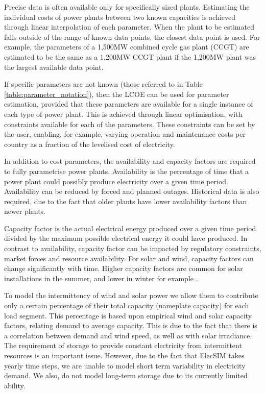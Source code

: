 Precise data is often available only for specifically sized plants. Estimating the individual costs of power plants between two known capacities is achieved through linear interpolation of each parameter. When the plant to be estimated falls outside of the range of known data points, the closest data point is used. {\color{red}For example, the parameters of a 1,500MW combined cycle gas plant (CCGT) are estimated to be the same as a 1,200MW CCGT plant if the 1,200MW plant was the largest available data point. }

If specific parameters are not known (those referred to in Table \ref{table:parameter_notation}), then the LCOE can be used for parameter estimation, provided that these parameters are available for a single instance of each type of power plant. This is achieved through linear optimisation, with constraints available for each of the parameters. These constraints can be set by the user, enabling, for example, varying operation and maintenance costs per country as a fraction of the levelised cost of electricity.


In addition to cost parameters, the availability and capacity factors are required to fully parametrise power plants. Availability is the percentage of time that a power plant could possibly produce electricity over a given time period. Availability can be reduced by forced and planned outages. Historical data is also required, due to the fact that older plants have lower availability factors than newer plants.

Capacity factor is the actual electrical energy produced over a given time period divided by the maximum possible electrical energy it could have produced. In contrast to availability, capacity factor can be impacted by regulatory constraints, market forces and resource availability. For solar and wind, capacity factors can change significantly with time. Higher capacity factors are common for solar installations in the summer, and lower in winter for example \cite{Stoft2002}. 

To model the intermittency of wind and solar power we allow them to contribute only a certain percentage of their total capacity (nameplate capacity) for each load segment. This percentage is based upon empirical wind and solar capacity factors, relating demand to average capacity. This is due to the fact that there is a correlation between demand and wind speed, as well as with solar irradiance. The requirement of storage to provide constant electricity from intermittent resources is an important issue. However, due to the fact that ElecSIM takes yearly time steps, we are unable to model short term variability in electricity demand. We also, do not model long-term storage due to its currently limited ability. 

